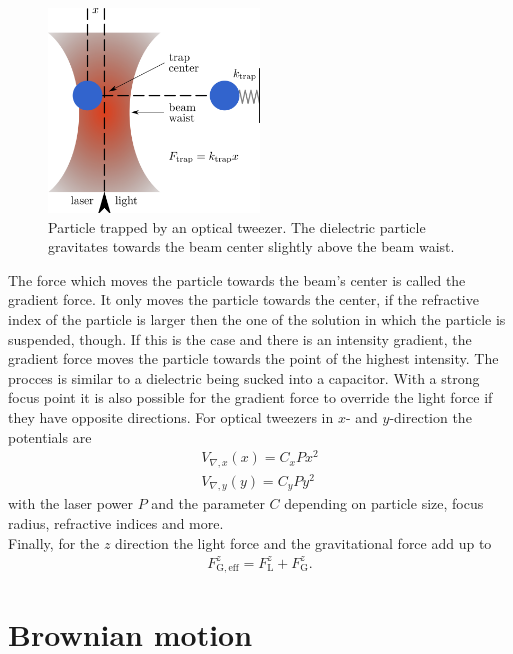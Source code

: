 \documentclass[.../bericht]{subfilies}
\begin{document}
    \begin{figure}[tb]
    \centering
    \includegraphics[width=0.5\textwidth]{figures/opticaltweezer}
    \caption{Particle trapped by an optical tweezer. The dielectric particle gravitates towards the beam center slightly above the beam waist. \cite{wiki:optical-tweezers}}
     \label{fig:tweezer}
    \end{figure}

    The force which moves the particle towards the beam's center is called the gradient force. It only moves the particle towards the center, if the refractive index of the particle is larger then the one of the solution in which the particle is suspended, though. If this is the case and there is an intensity gradient, the gradient force moves the particle towards the point of the highest intensity. The procces is similar to a dielectric being sucked into a capacitor. With a strong focus point it is also possible for the gradient force to override the light force if they have opposite directions. For optical tweezers in $x$- and $y$-direction the potentials are
    \begin{align}
    V_{\nabla,x}(x)=C_xPx^2\\
    V_{\nabla,y}(y)=C_yPy^2
    \end{align}
    with the laser power $P$ and the parameter $C$ depending on particle size, focus radius, refractive indices and more. \\
    Finally, for the $z$ direction the light force and the gravitational force add up to
    \begin{align}
    F_\mathrm{G,eff}^z=F_\mathrm{L}^z+F_\mathrm{G}^z.
    \end{align}
    \cite{helden}

    \section{Brownian motion}
    \label{sec:brownian-motion}
\end{document}

